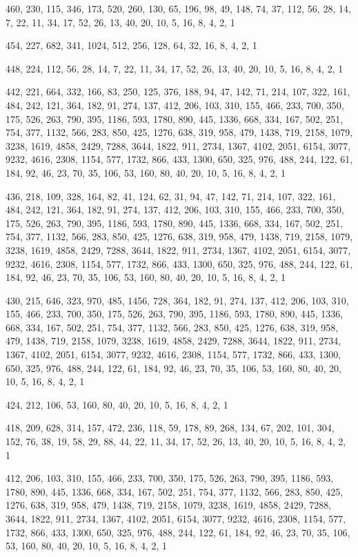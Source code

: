 \documentclass[12pt]{article}
\begin{document}
460, 230, 115, 346, 173, 520, 260, 130, 65, 196, 98, 49, 148, 74, 37, 112, 56, 28, 14, 7, 22, 11, 34, 17, 52, 26, 13, 40, 20, 10, 5, 16, 8, 4, 2, 1

454, 227, 682, 341, 1024, 512, 256, 128, 64, 32, 16, 8, 4, 2, 1

448, 224, 112, 56, 28, 14, 7, 22, 11, 34, 17, 52, 26, 13, 40, 20, 10, 5, 16, 8, 4, 2, 1

442, 221, 664, 332, 166, 83, 250, 125, 376, 188, 94, 47, 142, 71, 214, 107, 322, 161, 484, 242, 121, 364, 182, 91, 274, 137, 412, 206, 103, 310, 155, 466, 233, 700, 350, 175, 526, 263, 790, 395, 1186, 593, 1780, 890, 445, 1336, 668, 334, 167, 502, 251, 754, 377, 1132, 566, 283, 850, 425, 1276, 638, 319, 958, 479, 1438, 719, 2158, 1079, 3238, 1619, 4858, 2429, 7288, 3644, 1822, 911, 2734, 1367, 4102, 2051, 6154, 3077, 9232, 4616, 2308, 1154, 577, 1732, 866, 433, 1300, 650, 325, 976, 488, 244, 122, 61, 184, 92, 46, 23, 70, 35, 106, 53, 160, 80, 40, 20, 10, 5, 16, 8, 4, 2, 1

436, 218, 109, 328, 164, 82, 41, 124, 62, 31, 94, 47, 142, 71, 214, 107, 322, 161, 484, 242, 121, 364, 182, 91, 274, 137, 412, 206, 103, 310, 155, 466, 233, 700, 350, 175, 526, 263, 790, 395, 1186, 593, 1780, 890, 445, 1336, 668, 334, 167, 502, 251, 754, 377, 1132, 566, 283, 850, 425, 1276, 638, 319, 958, 479, 1438, 719, 2158, 1079, 3238, 1619, 4858, 2429, 7288, 3644, 1822, 911, 2734, 1367, 4102, 2051, 6154, 3077, 9232, 4616, 2308, 1154, 577, 1732, 866, 433, 1300, 650, 325, 976, 488, 244, 122, 61, 184, 92, 46, 23, 70, 35, 106, 53, 160, 80, 40, 20, 10, 5, 16, 8, 4, 2, 1

430, 215, 646, 323, 970, 485, 1456, 728, 364, 182, 91, 274, 137, 412, 206, 103, 310, 155, 466, 233, 700, 350, 175, 526, 263, 790, 395, 1186, 593, 1780, 890, 445, 1336, 668, 334, 167, 502, 251, 754, 377, 1132, 566, 283, 850, 425, 1276, 638, 319, 958, 479, 1438, 719, 2158, 1079, 3238, 1619, 4858, 2429, 7288, 3644, 1822, 911, 2734, 1367, 4102, 2051, 6154, 3077, 9232, 4616, 2308, 1154, 577, 1732, 866, 433, 1300, 650, 325, 976, 488, 244, 122, 61, 184, 92, 46, 23, 70, 35, 106, 53, 160, 80, 40, 20, 10, 5, 16, 8, 4, 2, 1

424, 212, 106, 53, 160, 80, 40, 20, 10, 5, 16, 8, 4, 2, 1

418, 209, 628, 314, 157, 472, 236, 118, 59, 178, 89, 268, 134, 67, 202, 101, 304, 152, 76, 38, 19, 58, 29, 88, 44, 22, 11, 34, 17, 52, 26, 13, 40, 20, 10, 5, 16, 8, 4, 2, 1

412, 206, 103, 310, 155, 466, 233, 700, 350, 175, 526, 263, 790, 395, 1186, 593, 1780, 890, 445, 1336, 668, 334, 167, 502, 251, 754, 377, 1132, 566, 283, 850, 425, 1276, 638, 319, 958, 479, 1438, 719, 2158, 1079, 3238, 1619, 4858, 2429, 7288, 3644, 1822, 911, 2734, 1367, 4102, 2051, 6154, 3077, 9232, 4616, 2308, 1154, 577, 1732, 866, 433, 1300, 650, 325, 976, 488, 244, 122, 61, 184, 92, 46, 23, 70, 35, 106, 53, 160, 80, 40, 20, 10, 5, 16, 8, 4, 2, 1
\end{document}
